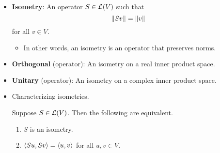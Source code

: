 \documentclass[../main.tex]{subfiles}
\begin{document}
\begin{itemize}
\begin{theorem}
\begin{proof}
\begin{equation*}
                v = a_1e_1+\cdots+a_ne_n
            \end{equation*}
            for $a_1,\dots,a_n\in\F$. Then
            \begin{equation*}
                a_1\lambda e_1+\cdots+a_n\lambda e_n = Tv = R^2v = a_1\lambda_1e_1+\cdots+a_n\lambda_ne_n
            \end{equation*}
            so since $e_1,\dots,e_n$ is linearly independent, $a_j(\lambda-\lambda_j)=0$ for all $j$. It follows that
            \begin{equation*}
                v = \sum_{\{j:\lambda_j=\lambda\}}a_je_j
            \end{equation*}
            so that
            \begin{align*}
                Rv &= \sum_{j=1}^na_j\sqrt{\lambda_j}e_j\\
                &= \sum_{\{j:\lambda_j=\lambda\}}a_j\sqrt{\lambda_j}e_j\\
                &= \sum_{\{j:\lambda_j=\lambda\}}a_j\sqrt{\lambda}e_j\\
                &= \sqrt{\lambda}v
            \end{align*}
            as desired.
        \end{proof}
    \end{theorem}
    \item \textbf{Isometry}: An operator $S\in\mathcal{L}(V)$ such that
    \begin{equation*}
        \norm{Sv} = \norm{v}
    \end{equation*}
    for all $v\in V$.
    \begin{itemize}
        \item In other words, an isometry is an operator that preserves norms.
    \end{itemize}
    \item \textbf{Orthogonal} (operator): An isometry on a real inner product space.
    \item \textbf{Unitary} (operator): An isometry on a complex inner product space.
    \item Characterizing isometries.
    \begin{theorem}\label{trm:isomConditions}
        Suppose $S\in\mathcal{L}(V)$. Then the following are equivalent.
        \begin{enumerate}[label={\textup{(}\alph*\textup{)}}]
            \item $S$ is an isometry.
            \item $\left\langle{Su},{Sv}\right\rangle=\left\langle{u},{v}\right\rangle$ for all $u,v\in V$.

\end{enumerate}
\end{theorem}
\end{itemize}
\end{document}
